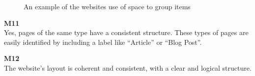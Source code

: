 \begin{description}
\begin{figure}[h]
        \caption{An example of the websites use of space to group items}
    \end{figure}
    \item {\textbf{M11} \color{unicefGray}{Consistency of the page structure}}\\
    Yes, pages of the same type have a consistent structure. These types of pages are easily identified by including a label like “Article” or “Blog Post”.
    \item {\textbf{M12} \color{unicefGray}{Coherence in page layout}}\\
    The website's layout is coherent and consistent, with a clear and logical structure.
\end{description}


